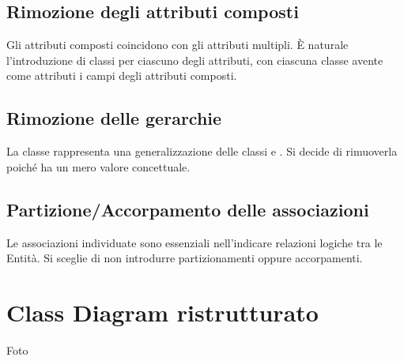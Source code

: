 \subsection{Rimozione degli attributi composti}
Gli attributi composti coincidono con gli attributi multipli. È naturale l'introduzione di classi per ciascuno degli attributi, con ciascuna classe avente come attributi i campi degli attributi composti. 
\subsection{Rimozione delle gerarchie}
La classe \Elemento rappresenta una generalizzazione delle classi \Contatto e \Gruppo. Si decide di rimuoverla poiché ha un mero valore concettuale.
\subsection{Partizione/Accorpamento delle associazioni}
Le associazioni individuate sono essenziali nell'indicare relazioni logiche tra le Entità. Si sceglie di non introdurre partizionamenti oppure accorpamenti.
\section{Class Diagram ristrutturato}
{\Huge Foto}
        
